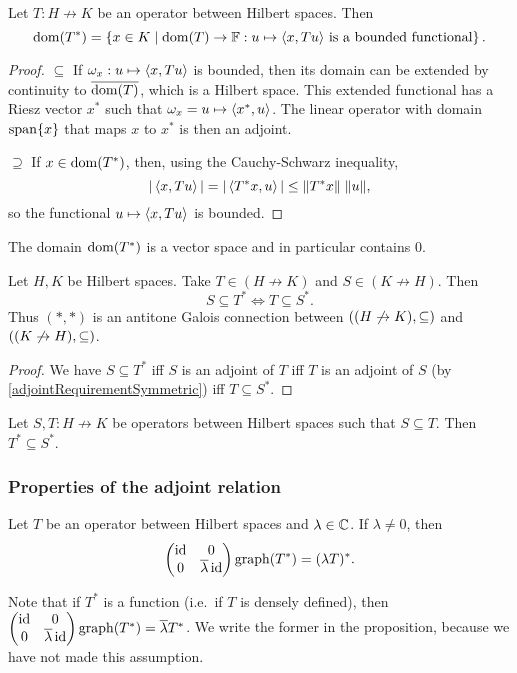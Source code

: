 \begin{proposition} \label{adjointDomain}
Let $T: H\not\to K$ be an operator between Hilbert spaces. Then
\[ \operatorname{dom}(T^*) = \left\{ x\in K \;\middle|\; \text{$\operatorname{dom}(T)\to \mathbb{F}: u\mapsto \left\langle x, Tu \right\rangle$ is a bounded functional} \right\}. \]
\end{proposition}
\begin{proof}
$\boxed{\subseteq}$ If $\omega_x: u\mapsto \left\langle x, Tu \right\rangle$ is bounded, then its domain can be extended by continuity to $\overline{\operatorname{dom}(T)}$, which is a Hilbert space. This extended functional has a Riesz vector $x^*$ such that $\omega_x = u\mapsto \left\langle x^*, u \right\rangle$. The linear operator with domain $\operatorname{span}\{x\}$ that maps $x$ to $x^*$ is then an adjoint.

$\boxed{\supseteq}$ If $x\in\operatorname{dom}(T^*)$, then, using the Cauchy-Schwarz inequality,
\[ |\left\langle x,Tu \right\rangle| = |\left\langle T^*x,u \right\rangle| \leq \lVert T^*x\rVert\;\lVert u\rVert, \]
so the functional $u\mapsto \left\langle x, Tu \right\rangle$ is bounded.
\end{proof}
\begin{corollary}
The domain $\operatorname{dom}(T^*)$ is a vector space and in particular contains $0$.
\end{corollary}

\begin{proposition} \label{HilbertAdjointGaloisConnection}
Let $H, K$ be Hilbert spaces. Take $T\in (H\not\to K)$ and $S\in (K\not\to H)$. Then
\[ S \subseteq T^* \iff T\subseteq S^*. \]
Thus $(*,*)$ is an antitone Galois connection between $\left( (H\not\to K), \subseteq \right)$ and $\left( (K\not\to H), \subseteq \right)$.
\end{proposition}
\begin{proof}
We have $S \subseteq T^*$ iff $S$ is an adjoint of $T$ iff $T$ is an adjoint of $S$ (by \ref{adjointRequirementSymmetric}) iff $T\subseteq S^*$.
\end{proof}
\begin{corollary} \label{HilbertAdjointAntitone}
Let $S,T: H\not\to K$ be operators between Hilbert spaces such that $S\subseteq T$. Then $T^* \subseteq S^*$.
\end{corollary}
\subsubsection{Properties of the adjoint relation}

\begin{proposition}
Let $T$ be an operator between Hilbert spaces and $\lambda\in\mathbb{C}$. If $\lambda \neq 0$, then
\[ \begin{pmatrix}
\operatorname{id} & 0 \\ 0 & \overline{\lambda}\operatorname{id}
\end{pmatrix} \operatorname{graph}(T^*) = (\lambda T)^*. \]
\end{proposition}
Note that if $T^*$ is a function (i.e.\ if $T$ is densely defined), then $\begin{pmatrix}
\operatorname{id} & 0 \\ 0 & \overline{\lambda}\operatorname{id}
\end{pmatrix} \operatorname{graph}(T^*) = \overline{\lambda}T^*$. We write the former in the proposition, because we have not made this assumption.

